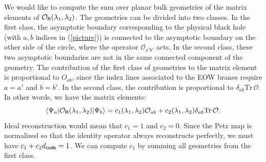 \documentclass[11pt]{article}
\newcommand{\be}{\begin{equation}}
\newcommand{\ee}{\end{equation}}
\numberwithin{equation}{section}
\def\tr{\text{Tr}}
\begin{document}
We would like to compute the sum over planar bulk geometries of the matrix elements of $\mathcal{O}_{\sf{R}}(\lambda_1,\lambda_2)$. The geometries can be divided into two classes. In the first class, the asymptotic boundary corresponding to the physical black hole (with $a,b$ indices in (\ref{picture})) is connected to the asymptotic boundary on the other side of the circle, where the operator $\mathcal{O}_{a'b'}$ acts. In the second class, these two asymptotic boundaries are not in the same connected component of the geometry. The contribution of the first class of geometries to the matrix element is proportional to $O_{ab}$, since the index lines associated to the EOW branes require $a = a'$ and $b = b'$. In the second class, the contribution is proportional to $ \delta _{ab}\tr\, \mathcal{O}$. In other words, we have the matrix elements:
\be
\langle\Psi_a|\mathcal{O}_{\sf{R}}(\lambda_1,\lambda_2)|\Psi_b\rangle=c_1(\lambda_1,\lambda_2) \mathcal{O}_{ab}+c_2(\lambda_1,\lambda_2)\delta_{ab} \tr \, \mathcal{O}.
\ee
Ideal reconstruction would mean that $c_1 = 1$ and $c_2 = 0$. Since the Petz map is normalized so that the identity operator always reconstructs perfectly, we must have $c_1+c_2 d_{\sf{code}}=1$. We can compute $c_1$ by summing all geometries from the first class.
\end{document}

